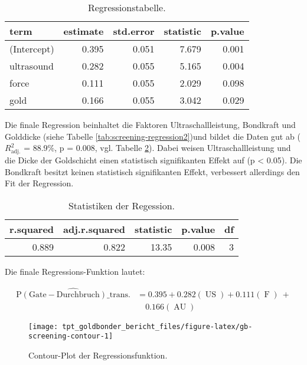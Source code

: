 \documentclass[
  paper=a4,
  ,captions=tableheading
]{scrartcl}
\begin{document}
\begin{table}

\caption{\label{tab:screening-regression1}Regressionstabelle.}
\centering
\begin{tabular}[t]{l|r|r|r|r}
\hline
term & estimate & std.error & statistic & p.value\\
\hline
(Intercept) & 0.395 & 0.051 & 7.679 & 0.001\\
\hline
ultrasound & 0.282 & 0.055 & 5.165 & 0.004\\
\hline
force & 0.111 & 0.055 & 2.029 & 0.098\\
\hline
gold & 0.166 & 0.055 & 3.042 & 0.029\\
\hline
\end{tabular}
\end{table}

Die finale Regression beinhaltet die Faktoren Ultraschallleistung, Bondkraft und Golddicke (siehe Tabelle \ref{tab:screening-regression2})und bildet die Daten gut ab (\(R^2_{\text{adj.}}\) = 88.9\%, p = 0.008, vgl. Tabelle \ref{tab:screening-regression2-stats}). Dabei weisen Ultraschallleistung und die Dicke der Goldschicht einen statistisch signifikanten Effekt auf (p \textless{} 0.05). Die Bondkraft besitzt keinen statistisch signifikanten Effekt, verbessert allerdings den Fit der Regression.

\begin{table}

\caption{\label{tab:screening-regression2-stats}Statistiken der Regession.}
\centering
\begin{tabular}[t]{r|r|r|r|r}
\hline
r.squared & adj.r.squared & statistic & p.value & df\\
\hline
0.889 & 0.822 & 13.35 & 0.008 & 3\\
\hline
\end{tabular}
\end{table}

Die finale Regressions-Funktion lautet:

\begin{equation}
\begin{aligned}
\operatorname{\widehat{P(Gate-Durchbruch)\_trans.}} &= 0.395 + 0.282(\operatorname{US}) + 0.111(\operatorname{F})\ + \\
&\quad 0.166(\operatorname{AU})
\end{aligned}
\end{equation}

\begin{figure}

{\centering \texttt{[image: tpt\_goldbonder\_bericht\_files/figure-latex/gb-screening-contour-1]} 

}

\caption{Contour-Plot der Regressionsfunktion.}\label{fig:gb-screening-contour}
\end{figure}
\end{document}
